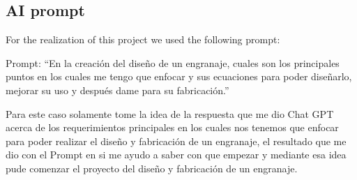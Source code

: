 \documentclass[11pt]{article}
\begin{document}
\subsection*{AI prompt}

For the realization of this project we used the following prompt:

Prompt: “En la creación del diseño de un engranaje, cuales son los principales puntos en los cuales me tengo que enfocar y sus ecuaciones para poder diseñarlo, mejorar su uso y después dame para su fabricación.”

Para este caso solamente tome la idea de la respuesta que me dio Chat GPT acerca de los requerimientos principales en los cuales nos tenemos que enfocar para poder realizar el diseño y fabricación de un engranaje, el resultado que me dio con el Prompt en si me ayudo a saber con que empezar y mediante esa idea pude comenzar el proyecto del diseño y fabricación de un engranaje.


\newpage

\nocite{*}

\end{document}
